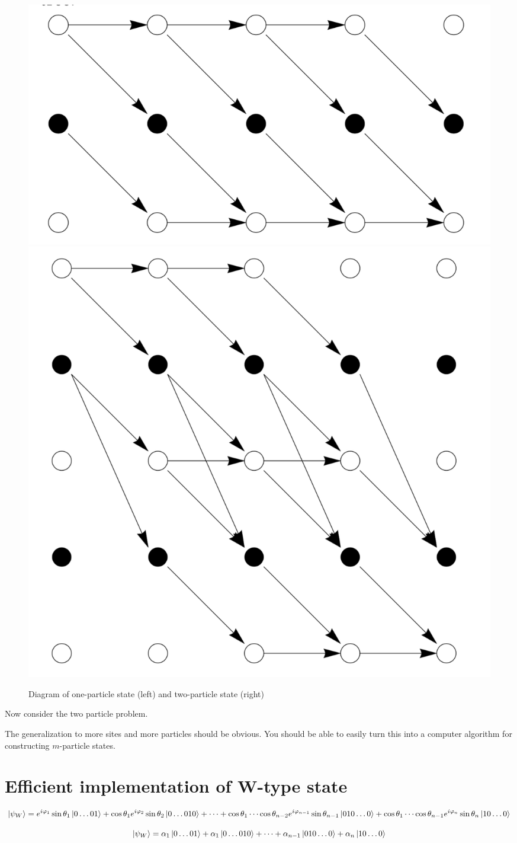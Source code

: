 \documentclass[11pt, oneside]{article}   	%
\begin{document}
\begin{figure}
\includegraphics[width=0.5 \linewidth]{figs/fig_one_particle_state}
\includegraphics[width=0.5 \linewidth]{figs/fig_two_particle_state}
\caption{Diagram of one-particle state (left) and two-particle state (right)}
\label{fig:ops}
\end{figure}

Now consider the two particle problem.

The generalization to more sites and more particles should be obvious. You should be able to easily turn this into a computer algorithm for constructing $m$-particle states.


\section{Efficient implementation of W-type state}
\begin{equation}
\ket{\psi_W} 
= e^{i \varphi_1} \sin \theta_1 \ket{0 \dots 01} + \cos \theta_1 e^{i \varphi_2} \sin \theta_2 \ket{0 \dots 010} + \cdots 
+ \cos \theta_1 \cdots \cos \theta_{n-2} e^{i \varphi_{n-1}} \sin \theta_{n-1} \ket{010 \dots 0} 
+ \cos \theta_1 \cdots \cos \theta_{n-1} e^{i \varphi_{n}} \sin \theta_{n} \ket{10 \dots 0} 
\end{equation}

\begin{equation}
\ket{\psi_W} 
= \alpha_1 \ket{0 \dots 01} + \alpha_1 \ket{0 \dots 010} + \cdots 
+ \alpha_{n-1} \ket{010 \dots 0} 
+ \alpha_n \ket{10 \dots 0} 
\end{equation}
\end{document}
